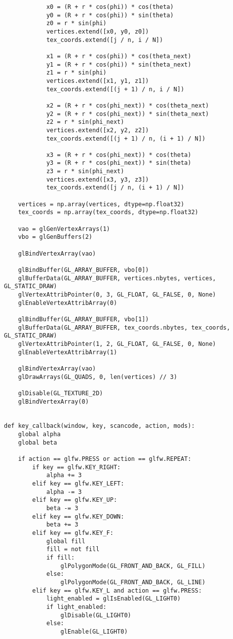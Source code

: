 \documentclass[a4paper, 14pt]{extarticle}
\begin{document}
\begin{lstlisting}
            x0 = (R + r * cos(phi)) * cos(theta)
            y0 = (R + r * cos(phi)) * sin(theta)
            z0 = r * sin(phi)
            vertices.extend([x0, y0, z0])
            tex_coords.extend([j / n, i / N])

            x1 = (R + r * cos(phi)) * cos(theta_next)
            y1 = (R + r * cos(phi)) * sin(theta_next)
            z1 = r * sin(phi)
            vertices.extend([x1, y1, z1])
            tex_coords.extend([(j + 1) / n, i / N])

            x2 = (R + r * cos(phi_next)) * cos(theta_next)
            y2 = (R + r * cos(phi_next)) * sin(theta_next)
            z2 = r * sin(phi_next)
            vertices.extend([x2, y2, z2])
            tex_coords.extend([(j + 1) / n, (i + 1) / N])

            x3 = (R + r * cos(phi_next)) * cos(theta)
            y3 = (R + r * cos(phi_next)) * sin(theta)
            z3 = r * sin(phi_next)
            vertices.extend([x3, y3, z3])
            tex_coords.extend([j / n, (i + 1) / N])

    vertices = np.array(vertices, dtype=np.float32)
    tex_coords = np.array(tex_coords, dtype=np.float32)

    vao = glGenVertexArrays(1)
    vbo = glGenBuffers(2)

    glBindVertexArray(vao)

    glBindBuffer(GL_ARRAY_BUFFER, vbo[0])
    glBufferData(GL_ARRAY_BUFFER, vertices.nbytes, vertices, GL_STATIC_DRAW)
    glVertexAttribPointer(0, 3, GL_FLOAT, GL_FALSE, 0, None)
    glEnableVertexAttribArray(0)

    glBindBuffer(GL_ARRAY_BUFFER, vbo[1])
    glBufferData(GL_ARRAY_BUFFER, tex_coords.nbytes, tex_coords, GL_STATIC_DRAW)
    glVertexAttribPointer(1, 2, GL_FLOAT, GL_FALSE, 0, None)
    glEnableVertexAttribArray(1)

    glBindVertexArray(vao)
    glDrawArrays(GL_QUADS, 0, len(vertices) // 3)

    glDisable(GL_TEXTURE_2D)
    glBindVertexArray(0)


def key_callback(window, key, scancode, action, mods):
    global alpha
    global beta

    if action == glfw.PRESS or action == glfw.REPEAT:
        if key == glfw.KEY_RIGHT:
            alpha += 3
        elif key == glfw.KEY_LEFT:
            alpha -= 3
        elif key == glfw.KEY_UP:
            beta -= 3
        elif key == glfw.KEY_DOWN:
            beta += 3
        elif key == glfw.KEY_F:
            global fill
            fill = not fill
            if fill:
                glPolygonMode(GL_FRONT_AND_BACK, GL_FILL)
            else:
                glPolygonMode(GL_FRONT_AND_BACK, GL_LINE)
        elif key == glfw.KEY_L and action == glfw.PRESS:
            light_enabled = glIsEnabled(GL_LIGHT0)
            if light_enabled:
                glDisable(GL_LIGHT0)
            else:
                glEnable(GL_LIGHT0)


\end{lstlisting}
\end{document}
